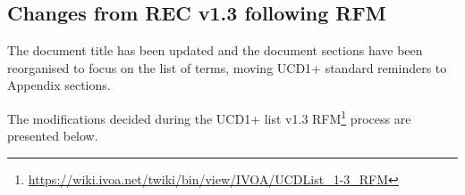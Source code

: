 \documentclass[11pt,a4paper]{ivoa}
\begin{document}
\subsection{Changes from REC v1.3 following RFM}
The document title has been updated and the document sections have been reorganised to focus on 
the list of terms, moving UCD1+ standard reminders to Appendix sections. 

The modifications decided during the UCD1+ list v1.3 
RFM\footnote{\url{https://wiki.ivoa.net/twiki/bin/view/IVOA/UCDList_1-3_RFM}} process are presented below.

\end{document}
